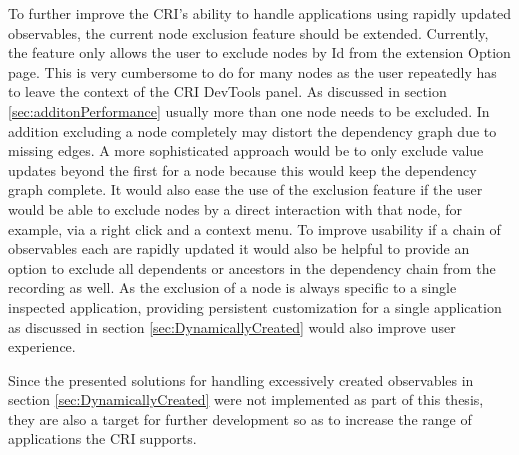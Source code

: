 To further improve the CRI's ability to handle applications using rapidly updated observables, the current node exclusion feature should be extended. Currently, the feature only allows the user to exclude nodes by Id from the extension Option page. This is very cumbersome to do for many nodes as the user repeatedly has to leave the context of the CRI DevTools panel. As discussed in section \ref{sec:additonPerformance} usually more than one node needs to be excluded. In addition excluding a node completely may distort the dependency graph due to missing edges. A more sophisticated approach would be to only exclude value updates beyond the first for a node because this would keep the dependency graph complete. It would also ease the use of the exclusion feature if the user would be able to exclude nodes by a direct interaction with that node, for example, via a right click and a context menu. To improve usability if a chain of observables each are rapidly updated it would also be helpful to provide an option to exclude all dependents or ancestors in the dependency chain from the recording as well.
As the exclusion of a node is always specific to a single inspected application, providing persistent customization for a single application as discussed in section \ref{sec:DynamicallyCreated} would also improve user experience.

Since the presented solutions for handling excessively created observables in section \ref{sec:DynamicallyCreated} were not implemented as part of this thesis, they are also a target for further development so as to increase the range of applications the CRI supports.
 	
